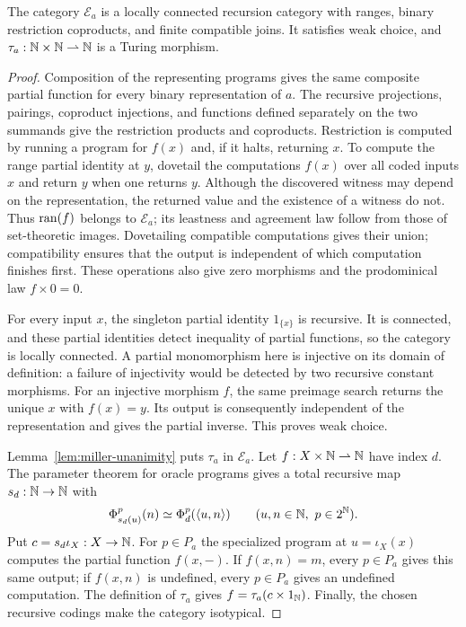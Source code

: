 \begin{proposition}\label{prop:miller-category}
The category $\mathcal E_a$ is a locally connected recursion category
with ranges, binary restriction coproducts, and finite compatible joins.
It satisfies weak choice, and $\tau_a:\mathbb N\times\mathbb N\rightharpoonup\mathbb N$
is a Turing morphism.
\end{proposition}
\begin{proof}
Composition of the representing programs gives the same composite
partial function for every binary representation of $a$.
The recursive projections, pairings,
coproduct injections, and functions defined separately on the two
summands give the restriction
products and coproducts. Restriction is computed by running a program for $f(x)$ and,
if it halts, returning $x$. To compute the range partial identity at
$y$, dovetail the computations $f(x)$ over all coded inputs $x$ and
return $y$ when one returns $y$. Although the discovered witness may
depend on the representation, the returned value and the existence of a witness
do not. Thus $\operatorname{ran}(f)$ belongs to $\mathcal E_a$; its leastness and
agreement law follow from those of set-theoretic images.
Dovetailing compatible computations gives their union;
compatibility ensures that the output is independent of which
computation finishes first. These operations also give zero morphisms and
the prodominical law $f\times0=0$.

For every input $x$, the singleton partial identity $1_{\{x\}}$ is
recursive. It is connected, and these partial identities detect
inequality of partial functions, so the category is locally connected.
A partial monomorphism here is injective on its domain of definition: a failure of
injectivity would be detected by two recursive constant morphisms. For an
injective morphism $f$, the same preimage search returns the unique $x$
with $f(x)=y$. Its output is consequently independent of the representation and
gives the partial inverse. This proves weak choice.

Lemma~\ref{lem:miller-unanimity} puts $\tau_a$ in $\mathcal E_a$.
Let $f:X\times\mathbb N\rightharpoonup\mathbb N$ have index $d$. The parameter
theorem for oracle programs gives a total recursive map $s_d:\mathbb N\to\mathbb N$
with
\[
 \Phi_{s_d(u)}^p(n)\simeq\Phi_d^p(\langle u,n\rangle)
 \qquad(u,n\in\mathbb N,\ p\in2^{\mathbb N}).
\]
Put $c=s_d\iota_X:X\to\mathbb N$. For $p\in P_a$ the specialized
program at $u=\iota_X(x)$ computes the partial function $f(x,-)$.
If $f(x,n)=m$, every $p\in P_a$ gives this same output; if $f(x,n)$ is
undefined, every $p\in P_a$ gives an undefined computation. The definition
of $\tau_a$ gives $f=\tau_a(c\times1_{\mathbb N})$.
Finally, the chosen recursive codings make the category isotypical.
\end{proof}

